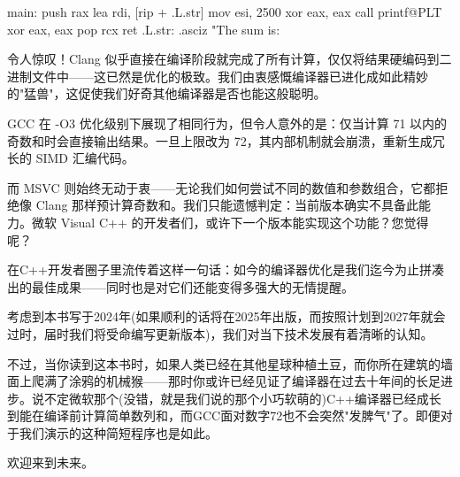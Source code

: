 \begin{shell}
main:
  push rax
  lea rdi, [rip + .L.str]
  mov esi, 2500
  xor eax, eax
  call printf@PLT
  xor eax, eax
  pop rcx
  ret
.L.str:
  .asciz "The sum is: %
\end{shell}

令人惊叹！Clang 似乎直接在编译阶段就完成了所有计算，仅仅将结果硬编码到二进制文件中——这已然是优化的极致。我们由衷感慨编译器已进化成如此精妙的"猛兽"，这促使我们好奇其他编译器是否也能这般聪明。

GCC 在 -O3 优化级别下展现了相同行为，但令人意外的是：仅当计算 71 以内的奇数和时会直接输出结果。一旦上限改为 72，其内部机制就会崩溃，重新生成冗长的 SIMD 汇编代码。

而 MSVC 则始终无动于衷——无论我们如何尝试不同的数值和参数组合，它都拒绝像 Clang 那样预计算奇数和。我们只能遗憾判定：当前版本确实不具备此能力。微软 Visual C++ 的开发者们，或许下一个版本能实现这个功能？您觉得呢？


在C++开发者圈子里流传着这样一句话：如今的编译器优化是我们迄今为止拼凑出的最佳成果——同时也是对它们还能变得多强大的无情提醒。

考虑到本书写于2024年(如果顺利的话将在2025年出版，而按照计划到2027年就会过时，届时我们将受命编写更新版本)，我们对当下技术发展有着清晰的认知。

不过，当你读到这本书时，如果人类已经在其他星球种植土豆，而你所在建筑的墙面上爬满了涂鸦的机械猴——那时你或许已经见证了编译器在过去十年间的长足进步。说不定微软那个(没错，就是我们说的那个小巧软萌的)C++编译器已经成长到能在编译前计算简单数列和，而GCC面对数字72也不会突然"发脾气"了。即便对于我们演示的这种简短程序也是如此。

欢迎来到未来。









